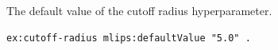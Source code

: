 The default value of the cutoff radius hyperparameter.
\begin{lstlisting}[language=turtle]
ex:cutoff-radius mlips:defaultValue "5.0" .
\end{lstlisting}
